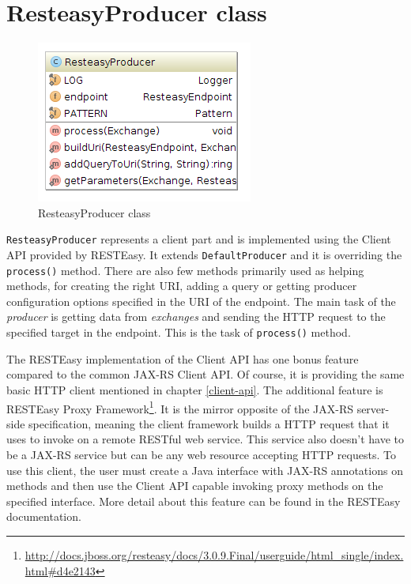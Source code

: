 \documentclass[12pt,final,oneside]{fithesis2}
\begin{document}
\section{ResteasyProducer class}\label{producer}
\begin{figure}[h]
\centering
\includegraphics[width=0.6\linewidth]{images/producer.png}
\caption{ResteasyProducer class}
\label{comp}
\end{figure}

\texttt{ResteasyProducer} represents a client part and is implemented using the Client API provided by RESTEasy. It extends \texttt{DefaultProducer} and it is overriding the \texttt{process()} method. There are also few methods  primarily used as helping methods, for creating the right URI, adding a query or getting producer configuration options specified in the URI of the endpoint. The main task of the \textit{producer} is getting data from \textit{exchanges} and sending the HTTP request to the specified target in the endpoint. This is the task of \texttt{process()} method. 

The RESTEasy implementation of the Client API has one bonus feature compared to the common JAX-RS Client API. Of course, it is providing the same basic HTTP client mentioned in chapter \ref{client-api}. The additional feature is RESTEasy Proxy Framework\footnote{\url{http://docs.jboss.org/resteasy/docs/3.0.9.Final/userguide/html_single/index.html\#d4e2143}}. It is the mirror opposite of the JAX-RS server-side specification, meaning the client framework builds a HTTP request that it uses to invoke on a remote RESTful web service. This service also doesn't have to be a JAX-RS service but can be any web resource accepting HTTP requests. To use this client, the user must create a Java interface with JAX-RS annotations on methods and then use the Client API capable invoking proxy methods on the specified interface\cite{resteasy-doc}. More detail about this feature can be found in the RESTEasy documentation. 
\end{document}

